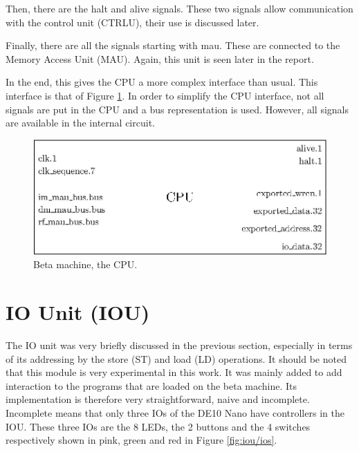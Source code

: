 Then, there are the halt and alive signals. These two signals allow communication with the control 
unit (CTRLU), their use is discussed later.

Finally, there are all the signals starting with mau. These are connected to the Memory Access Unit 
(MAU). Again, this unit is seen later in the report. 

In the end, this gives the CPU a more complex interface than usual. This interface is that of 
Figure \ref{fig:beta/interface}. In order to simplify the CPU interface, not all signals are put in 
the CPU and a bus representation is used. However, all signals are available in the internal circuit.

\begin{figure}[H]
    \centering
    \includegraphics[scale=0.8]{Chapter3-CPU/res/beta_machine}
    \caption{Beta machine, the CPU.}
    \label{fig:beta/interface}
\end{figure}

\section{IO Unit (IOU)}

The IO unit was very briefly discussed in the previous section, especially in terms of its 
addressing by the store (ST) and load (LD) operations. It should be noted that this module is 
very experimental in this work. It was mainly added to add interaction to the programs that 
are loaded on the beta machine. Its implementation is therefore very straightforward, naive and 
incomplete. Incomplete means that only three IOs of the DE10 Nano have controllers in the IOU. 
These three IOs are the 8 LEDs, the 2 buttons and the 4 switches respectively shown in pink, green
and red in Figure \ref{fig:iou/ios}.

